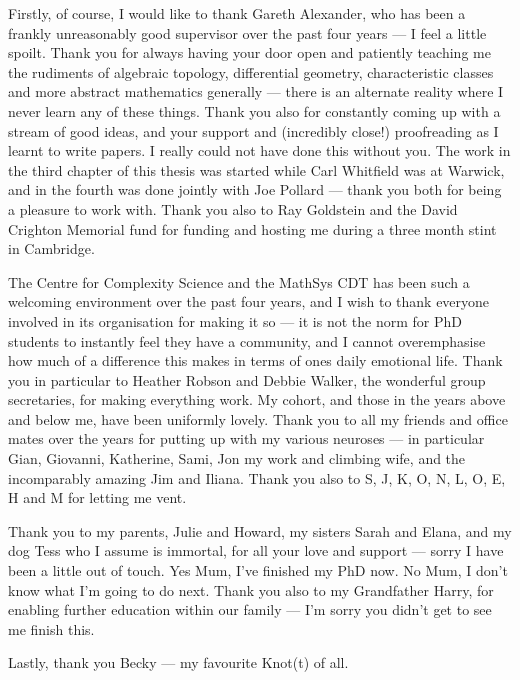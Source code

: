 Firstly, of course, I would like to thank Gareth Alexander, who has been a frankly unreasonably good supervisor over the past four years --- I feel a little spoilt. Thank you for always having your door open and patiently teaching me the rudiments of algebraic topology, differential geometry, characteristic classes and more abstract mathematics generally --- there is an alternate reality where I never learn any of these things. Thank you also for constantly coming up with a stream of good ideas, and your support and (incredibly close!) proofreading as I learnt to write papers. I really could not have done this without you. The work in the third chapter of this thesis was started while Carl Whitfield was at Warwick, and in the fourth was done jointly with Joe Pollard --- thank you both for being a pleasure to work with. Thank you also to Ray Goldstein and the David Crighton Memorial fund for funding and hosting me during a three month stint in Cambridge.  

The Centre for Complexity Science and the MathSys CDT has been such a welcoming environment over the past four years, and I wish to thank everyone involved in its organisation for making it so --- it is not the norm for PhD students to instantly feel they have a community, and I cannot overemphasise how much of a difference this makes in terms of ones daily emotional life. Thank you in particular to Heather Robson and Debbie Walker, the wonderful group secretaries, for making everything work.  My cohort, and those in the years above and below me, have been uniformly lovely. Thank you to all my friends and office mates over the years for putting up with my various neuroses --- in particular Gian, Giovanni, Katherine, Sami, Jon my work and climbing wife, and the incomparably amazing Jim and Iliana. Thank you also to S, J, K, O, N, L, O, E, H and M for letting me vent.

Thank you to my parents, Julie and Howard, my sisters Sarah and Elana, and my dog Tess who I assume is immortal, for all your love and support --- sorry I have been a little out of touch. Yes Mum, I've finished my PhD now. No Mum, I don't know what I'm going to do next. Thank you also to my Grandfather Harry, for enabling further education within our family --- I'm sorry you didn't get to see me finish this.

 Lastly, thank you Becky --- my favourite Knot(t) of all.

